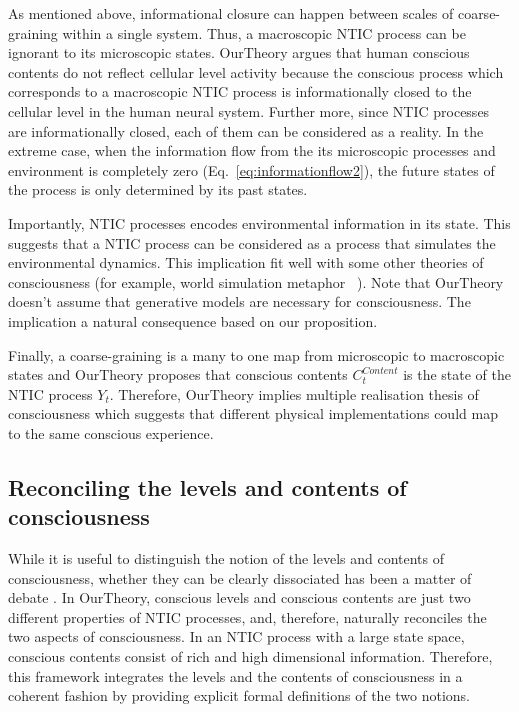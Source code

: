 \documentclass[utf8]{article}
\begin{document}
    		As mentioned above, informational closure can happen between scales of coarse-graining within a single system. Thus, a macroscopic NTIC process can be ignorant to its microscopic states. \ac{OurTheory} argues that human conscious contents do not reflect cellular level activity because the conscious process which corresponds to a macroscopic NTIC process is informationally closed to the cellular level in the human neural system. Further more, since NTIC processes are informationally closed, each of them can be considered as a reality. In the extreme case, when the information flow from the its microscopic processes and environment is completely zero (Eq.~\ref{eq:informationflow2}), the future states of the process is only determined by its past states. 
    		
    		Importantly, NTIC processes encodes environmental information in its state. This suggests that a NTIC process can be considered as a process that simulates the environmental dynamics. This implication fit well with some other theories of consciousness (for example, world simulation metaphor ~\citep{revonsuo2006inner}). Note that \ac{OurTheory} doesn't assume that generative models are necessary for consciousness. The implication a natural consequence based on our proposition. 
            
            Finally, a coarse-graining is a many to one map from microscopic to macroscopic states and \ac{OurTheory} proposes that conscious contents $C_{t}^{Content}$ is the state of the NTIC process $Y_t$. Therefore, \ac{OurTheory} implies multiple realisation thesis of consciousness \citep{putnam1967psychological,bechtel1999multiple} which suggests that different physical implementations could map to the same conscious experience.
            
            
	    \subsection{Reconciling the levels and contents of consciousness}\label{sec:reconcile}
    	    While it is useful to distinguish the notion of the  levels and contents of consciousness, whether they can be clearly dissociated has been a matter of debate \citep{bayne2016there, Fazekas2016}. In \ac{OurTheory}, conscious levels and conscious contents are just two different properties of NTIC processes, and, therefore, naturally reconciles the two aspects of consciousness. In an NTIC process with a large state space, conscious contents consist of rich and high dimensional information. Therefore, this framework integrates the levels and the contents of consciousness in a coherent fashion by providing explicit formal definitions of the two notions.  
    	    
\end{document}
